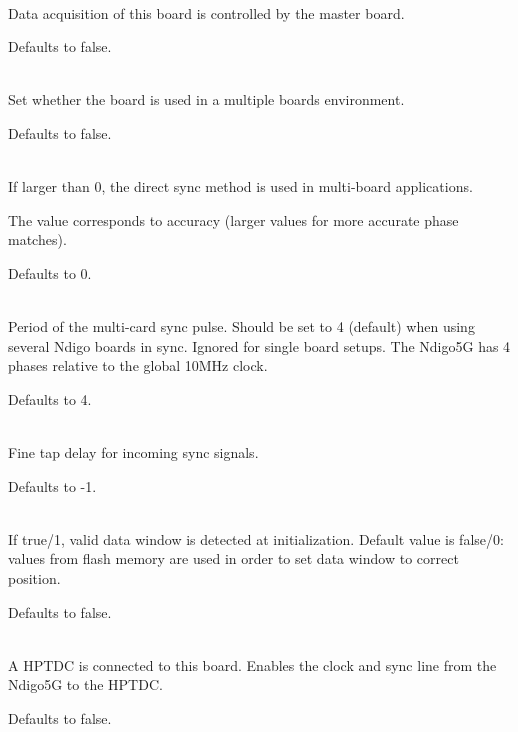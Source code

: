             \\
            Data acquisition of this board is controlled by the master board.\par
            Defaults to false.\par

            \\
            Set whether the board is used in  a multiple boards environment.\par
            Defaults to false.\par

            \\
            If larger than 0, the direct sync method is used in multi-board applications.\par
            The value corresponds to accuracy (larger values for more accurate phase matches).\par
            Defaults to 0.\par

            \\
            Period of the multi-card sync pulse. Should be set to 4 (default) when using several Ndigo boards in sync. Ignored for single board setups. The Ndigo5G has 4 phases relative to the global 10MHz clock.\par
            Defaults to 4.\par

            \\
            Fine tap delay for incoming sync signals.\par
            Defaults to -1.\par

            \\
            If true/1, valid data window is detected at initialization. Default value is false/0: values from flash memory are used in order to set data window to correct position.\par
            Defaults to false.\par

            \\
            A HPTDC is connected to this board. Enables the clock and sync line from the Ndigo5G to the HPTDC.\par
            Defaults to false.\par

